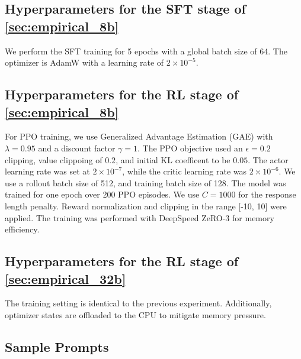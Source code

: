 


\subsection{Hyperparameters for the SFT stage of \autoref{sec:empirical_8b}}
\label{sec:appendix_empirical_8b_sft_hyperparams}
We perform the SFT training for 5 epochs with a global batch size of 64. The optimizer is AdamW with a learning rate of $2\times 10 ^{-5}$.

\subsection{Hyperparameters for the RL stage of \autoref{sec:empirical_8b}}
\label{sec:appendix_empirical_8b_rl_hyperparams}
For PPO training, we use Generalized Advantage Estimation (GAE) with $\lambda=0.95$ and a discount factor $\gamma=1$. The PPO objective used an $\epsilon=0.2$ clipping, value clippoing of $0.2$, and initial KL coefficent to be $0.05$. The actor learning rate was set at $2\times 10^{-7}$, while the critic learning rate was $2\times 10^{-6}$.
We use a rollout batch size of 512, and training batch size of 128. The model was trained for one epoch over 200 PPO episodes. We use $C=1000$ for the response length penalty. Reward normalization and clipping in the range [-10, 10] were applied.
The training was performed with DeepSpeed ZeRO-3 for memory efficiency. 

\subsection{Hyperparameters for the RL stage of \autoref{sec:empirical_32b}}
\label{sec:appendix_empirical_32b_rl_hyperparams} The training setting is identical to the previous experiment. Additionally, optimizer states are offloaded to the CPU to mitigate memory pressure.



\subsection{Sample Prompts}\label{sec:prompts}


